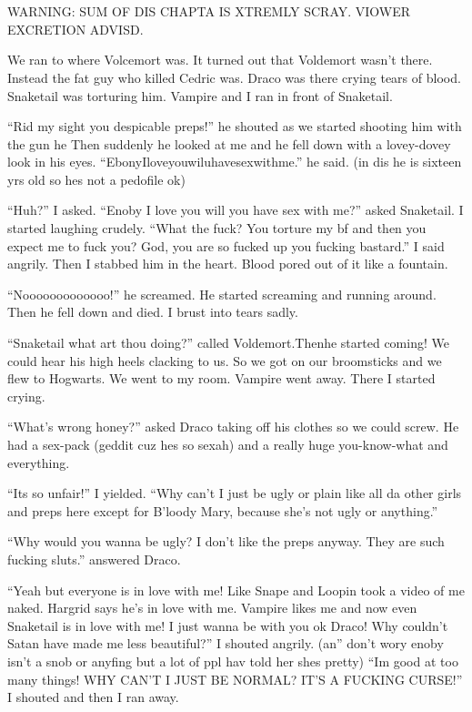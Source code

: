\section{\chaptername~\thesection}



WARNING: SUM OF DIS CHAP\-TA IS XTREM\-LY
\linebreak SCRAY\@. VIOWER EX\-CRE\-TION ADVISD.

We ran to where Volcemort was. It turned out that Voldemort wasn't there. Instead the fat guy who killed Cedric was. Draco was there crying tears of blood. Snaketail was torturing him. Vampire and I ran in front of Snaketail.

\enquote{Rid my sight you despicable preps!} he shouted as we started shooting him with the gun he Then suddenly he looked at me and he fell down with a lovey-dovey look in his eyes. \enquote{EbonyIloveyouwiluhavesexwithme.} he said. (in dis he is sixteen yrs old so hes not a pedofile ok)

\enquote{Huh?} I asked.
\enquote{Enoby I love you will you have sex with me?} asked Snaketail. I started laughing crudely. \enquote{What the fuck? You torture my bf and then you expect me to fuck you? God, you are so fucked up you fucking bastard.} I said angrily. Then I stabbed him in the heart. Blood pored out of it like a fountain.

\enquote{Nooooooooooooo!} he screamed. He started screaming and running around. Then he fell down and died. I brust into tears sadly.

\enquote{Snaketail what art thou doing?} called Voldemort.\linebreak Then\dotfill he started coming! We could hear his high heels clacking to us. So we got on our broomsticks and we flew to Hogwarts. We went to my room. Vampire went away. There I started crying.

\enquote{What's wrong honey?} asked Draco taking off his clothes so we could screw. He had a sex-pack (geddit cuz hes so sexah) and a really huge you-know-what and everything.

\enquote{Its so unfair!} I yielded. \enquote{Why can't I just be ugly or plain like all da other girls and preps here except for B'loody Mary, because she's not ugly or anything.}

\enquote{Why would you wanna be ugly? I don't like the preps anyway. They are such fucking sluts.} answered Draco.

\enquote{Yeah but everyone is in love with me! Like Snape and Loopin took a video of me naked. Hargrid says he's in love with me. Vampire likes me and now even Snaketail is in love with me! I just wanna be with you ok Draco! Why couldn't Satan have made me less beautiful?} I shouted angrily. (an'' don't wory enoby isn't a snob or anyfing but a lot of ppl hav told her shes pretty) \enquote{Im good at too many things! WHY CAN'T I JUST BE NORMAL\@? IT'S A FUCKING CURSE\@!} I shouted and then I ran away.
